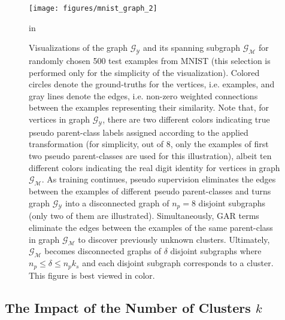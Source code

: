 \documentclass{article} \usepackage{iclr2018_conference,times}
\begin{document}
\begin{figure}[h]
	\begin{center}
		\centerline{\texttt{[image: figures/mnist\_graph\_2]}}
		\caption{Visualizations of the graph $\mathcal{G}_\mathcal{Y}$ and its spanning subgraph $\mathcal{G}_\mathcal{M}$ for randomly chosen 500 test examples from MNIST (this selection is performed only for the simplicity of the visualization). Colored circles denote the ground-truths for the vertices, i.e. examples, and gray lines denote the edges, i.e. non-zero weighted connections between the examples representing their similarity. Note that, for vertices in graph $\mathcal{G}_\mathcal{Y}$, there are two different colors indicating true pseudo parent-class labels assigned according to the applied transformation (for simplicity, out of 8, only the examples of first two pseudo parent-classes are used for this illustration), albeit ten different colors indicating the real digit identity for vertices in graph $\mathcal{G}_\mathcal{M}$. As training continues, pseudo supervision eliminates the edges between the examples of different pseudo parent-classes and turns graph $\mathcal{G}_\mathcal{Y}$ into a disconnected graph of $n_p=8$ disjoint subgraphs (only two of them are illustrated). Simultaneously, GAR terms eliminate the edges between the examples of the same parent-class in graph $\mathcal{G}_\mathcal{M}$ to discover previously unknown clusters. Ultimately, $\mathcal{G}_\mathcal{M}$ becomes disconnected graphs of $\delta$ disjoint subgraphs where $n_p\le \delta \le n_pk_s$ and each disjoint subgraph corresponds to a cluster. This figure is best viewed in color.}
	\label{fig:pseudo_img_graph}
	\end{center}
	 in
\end{figure}

\subsection{The Impact of the Number of Clusters $k$}
\end{document}
